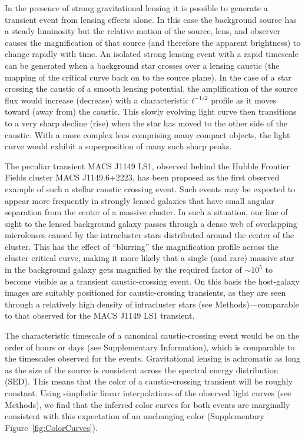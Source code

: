 In the presence of strong gravitational lensing it is possible to
generate a transient event from lensing effects alone.  In this case
the background source has a steady luminosity but the relative motion
of the source, lens, and observer causes the magnification of that
source (and therefore the apparent brightness) to change rapidly with
time.  An isolated strong lensing event with a rapid timescale can be
generated when a background star crosses over a lensing caustic (the
mapping of the critical curve back on to the source plane).  In the
case of a star crossing the caustic of a smooth lensing potential, the
amplification of the source flux would increase (decrease) with a
characteristic $t^{-1/2}$ profile as it moves toward (away from) the
caustic. This slowly evolving light curve then transitions to a very
sharp decline (rise) when the star has moved to the other side of the
caustic\cite{Schneider:1986, MiraldaEscude:1991}.  With a more complex
lens comprising many compact objects, the light curve would exhibit a
superposition of many such sharp peaks\cite{Lewis:1993, Diego:2017}.

The peculiar transient MACS J1149 LS1, observed behind the Hubble
Frontier Fields cluster MACS J1149.6+2223, has been proposed as the
first observed example of such a stellar caustic crossing
event\cite{Kelly:2017}. Such events may be expected to appear more
frequently in strongly lensed galaxies that have small angular
separation from the center of a massive cluster. In such a situation,
our line of sight to the lensed background galaxy passes through a
dense web of overlapping microlenses caused by the intracluster stars
distributed around the center of the cluster. This has the effect of
``blurring'' the magnification profile across the cluster critical
curve, making it more likely that a single (and rare) massive star in
the background galaxy gets magnified by the required factor of
$\sim10^5$ to become visible as a transient caustic-crossing event.
On this basis the \spock host-galaxy images are suitably positioned
for caustic-crossing transients, as they are seen through a relatively
high density of intracluster stars (see Methods)---comparable to that
observed for the MACS J1149 LS1 transient.

The characteristic timescale of a canonical caustic-crossing event
would be on the order of hours or days (see Supplementary
Information), which is comparable to the timescales observed for the
\spock events. Gravitational lensing is achromatic as long as the size
of the source is consistent across the spectral energy distribution
(SED).  This means that the color of a caustic-crossing transient will
be roughly constant.  Using simplistic linear interpolations of the
observed light curves (see Methods), we find that the inferred color
curves for both \spock events are marginally consistent with this
expectation of an unchanging color (Supplementary
Figure~\ref{fig:ColorCurves}).

